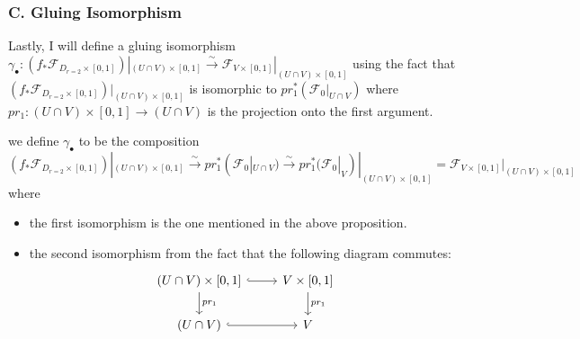 \subsubsection{C. Gluing Isomorphism}
Lastly, I will define a gluing isomorphism $\gamma_\bullet : (f_*\mathscr{F}_{D_{r=2}\times [0,1]})|_{(U\cap V)\times [0,1]} \xrightarrow{\sim} \mathscr{F}_{V\times [0,1]}|_{(U\cap V)\times [0,1]}$ using the fact that $(f_*\mathscr{F}_{D_{r=2}\times [0,1]})|_{(U\cap V)\times[0,1]}$ is isomorphic to $pr_1^*(\mathscr{F}_0|_{U\cap V})$ where $pr_1 : (U\cap V) \times [0,1] \rightarrow (U\cap V)$ is the projection onto the first argument.
\begin{definition}
we define $\gamma_\bullet$ to be the composition 
\[
(f_*\mathscr{F}_{D_{r=2}\times [0,1]})|_{(U\cap V)\times [0,1]}\xrightarrow{\sim}pr_1^*(\mathscr{F}_0|_{U\cap V})\xrightarrow{\sim}pr_1^*(\mathscr{F}_0|_{V})|_{(U\cap V)\times [0,1]}=\mathscr{F}_{V\times [0,1]}|_{(U\cap V)\times [0,1]}
\]
where
\begin{itemize}
\item the first isomorphism is the one mentioned in the above proposition.

\item the second isomorphism from the fact that the following diagram commutes:
\[
\begin{tikzcd}
(U\cap V)\times [0,1] \arrow[hookrightarrow]{r}\arrow[d, "pr_1"]     & V\times [0,1] \arrow[d, "pr_1"] \\
(U\cap V) \arrow[hookrightarrow]{r} & V 
\end{tikzcd}
\]
\end{itemize}
\end{definition}

